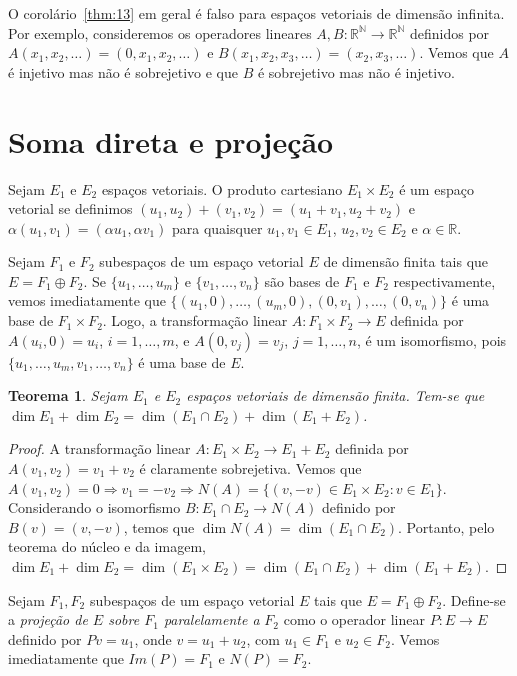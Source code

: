 \documentclass[12pt,a4paper]{article}
\newcommand{\N}{\mathbb{N}}
\newcommand{\R}{\mathbb{R}}
\newtheorem{thm}{Teorema}[section]
\theoremstyle{definition}
\begin{document}
O corolário~\ref{thm:13} em geral é falso para espaços vetoriais de
dimensão infinita. Por exemplo, consideremos os operadores lineares
$A,B:\R^\N\to\R^\N$ definidos por
$A(x_1,x_2,\ldots)=(0,x_1,x_2,\ldots)$ e
$B(x_1,x_2,x_3,\ldots)=(x_2,x_3,\ldots)$. Vemos que $A$ é injetivo mas
não é sobrejetivo e que $B$ é sobrejetivo mas não é injetivo.

\section{Soma direta e projeção}

Sejam $E_1$ e $E_2$ espaços vetoriais. O produto cartesiano
$E_1\times E_2$ é um espaço vetorial se definimos
$(u_1,u_2)+(v_1,v_2)=(u_1+v_1,u_2+v_2)$ e
$\alpha(u_1,v_1)=(\alpha u_1,\alpha v_1)$ para quaisquer
$u_1,v_1\in E_1$, $u_2,v_2\in E_2$ e $\alpha\in\R$.

Sejam $F_1$ e $F_2$ subespaços de um espaço vetorial $E$ de dimensão
finita tais que $E=F_1\oplus F_2$. Se $\{u_1,\ldots,u_m\}$ e
$\{v_1,\ldots,v_n\}$ são bases de $F_1$ e $F_2$ respectivamente, vemos
imediatamente que $\{(u_1,0),\ldots,(u_m,0),(0,v_1),\ldots,(0,v_n)\}$
é uma base de $F_1\times F_2$. Logo, a transformação linear
$A:F_1\times F_2\to E$ definida por $A(u_i,0)=u_i$, $i=1,\ldots,m$, e
$A(0,v_j)=v_j$, $j=1,\ldots,n$, é um isomorfismo, pois
$\{u_1,\ldots,u_m,v_1,\ldots,v_n\}$ é uma base de $E$.

\begin{thm}
  Sejam $E_1$ e $E_2$ espaços vetoriais de dimensão finita. Tem-se que
  $\dim E_1+\dim E_2=\dim(E_1\cap E_2)+\dim (E_1+E_2)$.
\end{thm}
\begin{proof}
  A transformação linear $A:E_1\times E_2\to E_1+E_2$ definida por
  $A(v_1,v_2)=v_1+v_2$ é claramente sobrejetiva. Vemos que
  $A(v_1,v_2)=0\Rightarrow v_1=-v_2\Rightarrow N(A)=\{(v,-v)\in
  E_1\times E_2:v\in E_1\}$. Considerando o isomorfismo
  $B:E_1\cap E_2\to N(A)$ definido por $B(v)=(v,-v)$, temos que
  $\dim N(A)=\dim (E_1\cap E_2)$. Portanto, pelo teorema do núcleo e
  da imagem,
  $\dim E_1+\dim E_2=\dim (E_1\times E_2)=\dim (E_1\cap E_2)+\dim
  (E_1+E_2)$.
\end{proof}

Sejam $F_1,F_2$ subespaços de um espaço vetorial $E$ tais que
$E=F_1\oplus F_2$. Define-se a \textit{projeção de $E$ sobre $F_1$
  paralelamente a} $F_2$ como o operador linear $P:E\to E$ definido
por $Pv=u_1$, onde $v=u_1+u_2$, com $u_1\in F_1$ e $u_2\in F_2$. Vemos
imediatamente que $Im(P)=F_1$ e $N(P)=F_2$.
\end{document}

